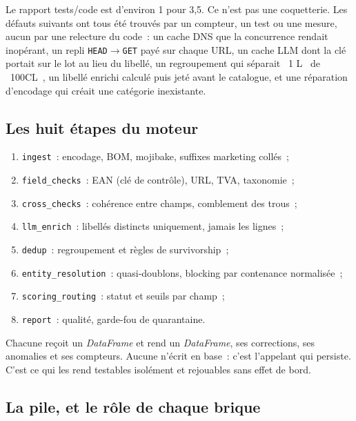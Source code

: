 \documentclass[11pt,a4paper]{article}
\newcommand{\code}[1]{\texttt{\small #1}}
\newcommand{\gui}[1]{\guillemotleft{}~#1~\guillemotright{}}
\begin{document}
\vspace{4pt}
Le rapport tests/code est d'environ 1 pour 3,5. Ce n'est pas une coquetterie. Les défauts
suivants ont tous été trouvés par un compteur, un test ou une mesure, aucun par une relecture du
code~: un cache DNS que la concurrence rendait inopérant, un repli \code{HEAD}$\rightarrow$\code{GET}
payé sur chaque URL, un cache LLM dont la clé portait sur le lot au lieu du libellé, un
regroupement qui séparait \gui{1 L} de \gui{100CL}, un libellé enrichi calculé puis jeté avant le
catalogue, et une réparation d'encodage qui créait une catégorie inexistante.

\subsection{Les huit étapes du moteur}
\begin{enumerate}
  \item \code{ingest}~: encodage, BOM, mojibake, suffixes marketing collés~;
  \item \code{field\_checks}~: EAN (clé de contrôle), URL, TVA, taxonomie~;
  \item \code{cross\_checks}~: cohérence entre champs, comblement des trous~;
  \item \code{llm\_enrich}~: libellés distincts uniquement, jamais les lignes~;
  \item \code{dedup}~: regroupement et règles de survivorship~;
  \item \code{entity\_resolution}~: quasi-doublons, blocking par contenance normalisée~;
  \item \code{scoring\_routing}~: statut et seuils par champ~;
  \item \code{report}~: qualité, garde-fou de quarantaine.
\end{enumerate}

Chacune reçoit un \emph{DataFrame} et rend un \emph{DataFrame}, ses corrections, ses anomalies et
ses compteurs. Aucune n'écrit en base~: c'est l'appelant qui persiste. C'est ce qui les rend
testables isolément et rejouables sans effet de bord.

\subsection{La pile, et le rôle de chaque brique}
\end{document}
